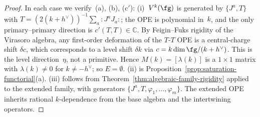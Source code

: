 \begin{proof}
In each case we verify~(a), (b), (c$'$):
(i)~$V^k(\fg)$ is generated by $\{J^a, T\}$ with
$T = (2(k+h^\vee))^{-1} \sum_a {:}J^a J_a{:}$;
the OPE is polynomial in~$k$, and the only primary--primary
direction is $c'(T,T) \in \mathbb{C}$.  By Feigin--Fuks rigidity
of the Virasoro algebra, any first-order deformation of the
$T$-$T$ OPE is a central-charge shift $\delta c$, which
corresponds to a level shift $\delta k$ via
$c = k\dim\fg/(k+h^\vee)$.  This is the level
direction~$\eta$, not a primitive.  Hence
$M(k) = [\lambda(k)]$ is a $1 \times 1$ matrix with
$\lambda(k) \neq 0$ for $k \neq -h^\vee$; so
$E = \emptyset$.
(ii) is
Proposition~\ref{prop:saturation-functorial}(a).
(iii) follows from
Theorem~\ref{thm:algebraic-family-rigidity} applied to
the extended family, with generators
$\{J^a, T, \varphi_1, \ldots, \varphi_m\}$.
The extended OPE inherits rational $k$-dependence
from the base algebra and the intertwining operators.
\end{proof}

